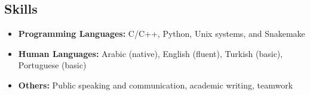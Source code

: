 \documentclass[margin]{res}
\begin{document}
\begin{resume}




    

\section{Skills}
\begin{itemize}[leftmargin=*]
	\item \textbf{Programming Languages:} C/C++, Python, Unix systems, and Snakemake
	\item \textbf{Human Languages:} Arabic (native), English (fluent), Turkish (basic), Portuguese (basic)
	\item \textbf{Others:} Public speaking and communication, academic writing, teamwork
\end{itemize}
	
	

% 	


\end{resume}
\end{document}
